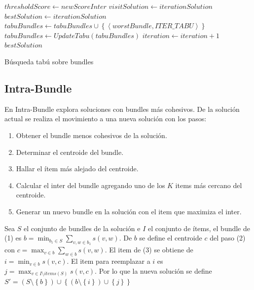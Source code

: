\begin{algorithm}[H]
\begin{algorithmic}[1]
    \ELSE
        \STATE $thresholdScore \leftarrow newScoreInter$
        \STATE $visitSolution \leftarrow iterationSolution$
      \ENDIF
    \ENDIF
  \ENDFOR
    \STATE $bestSolution \leftarrow iterationSolution$
  \ENDIF
  \STATE $tabuBundles \leftarrow tabuBundles \cup \left\{
	\left\langle worstBundle, ITER\_TABU \right\rangle\right\}$
	\STATE $tabuBundles \leftarrow UpdateTabu(tabuBundles)$
	\STATE $iteration \leftarrow iteration + 1$
\ENDWHILE
\RETURN $bestSolution$
\end{algorithmic}
\caption{Búsqueda tabú sobre bundles}\label{alg:algBusTabuBundle}
\end{algorithm}

\subsection{Intra-Bundle}
En Intra-Bundle explora soluciones con bundles más cohesivos. De la solución actual se realiza el movimiento a una nueva solución con los pasos:
\begin{enumerate}
	\item Obtener el bundle menos cohesivos de la solución.
	\item Determinar el centroide del bundle.
	\item Hallar el ítem más alejado del centroide.
	\item Calcular el inter del bundle agregando uno de los $K$ items más cercano del centroide.
	\item Generar un nuevo bundle en la solución con el item que maximiza el inter.
\end{enumerate}

Sea $S$ el conjunto de bundles de la solución e $I$ el conjunto de ítems, el bundle de (1) es $b = \min_{b_1 \in S}{\sum_{v,w \in b_1}{s(v,w)}}$. De $b$ se define el centroide $c$ del paso (2) con $c = \max_{v \in b}{\sum_{w \in b}{s(v,w)}}$. El item de (3) se obtiene de $i = \min_{v \in b}{s(v,c)}$. El item para reemplazar a $i$ es $j = \max_{v \in I \setminus items(S)}{s(v,c)}$. Por lo que la nueva solución se define $S' = (S \setminus \left\{b\right\}) \cup \left\{(b \setminus \left\{i\right\})\cup\left\{j\right\}\right\}$

